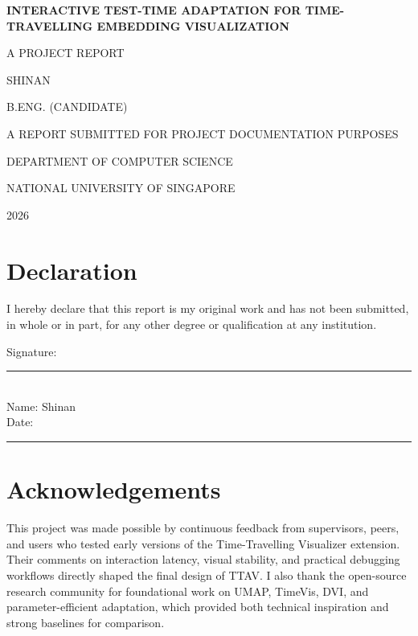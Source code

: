 \documentclass[12pt,a4paper]{report}
\newcommand{\systemname}{TTAV}
\newcommand{\projectname}{Time-Travelling Visualizer}
\begin{document}

\begin{titlepage}
\centering
{\fontsize{16}{20}\selectfont\bfseries INTERACTIVE TEST-TIME ADAPTATION FOR TIME-TRAVELLING EMBEDDING VISUALIZATION\par}
\vspace{2.5cm}
{\Large A PROJECT REPORT\par}
\vspace{2.0cm}
{\large SHINAN\par}
\vspace{1.0cm}
{\large B.ENG. (CANDIDATE)\par}
\vfill
{\large A REPORT SUBMITTED FOR PROJECT DOCUMENTATION PURPOSES\par}
\vspace{0.7cm}
{\large DEPARTMENT OF COMPUTER SCIENCE\par}
{\large NATIONAL UNIVERSITY OF SINGAPORE\par}
\vspace{0.7cm}
{\large 2026\par}
\end{titlepage}

\cleardoublepage
{}
\setcounter{page}{1}

\chapter*{Declaration}
I hereby declare that this report is my original work and has not been submitted, in whole or in part, for any other degree or qualification at any institution.

\vspace{1.5cm}
\noindent
Signature: \rule{5cm}{0.4pt}\\
Name: Shinan\\
Date: \rule{3cm}{0.4pt}

\chapter*{Acknowledgements}
This project was made possible by continuous feedback from supervisors, peers, and users who tested early versions of the \projectname{} extension. Their comments on interaction latency, visual stability, and practical debugging workflows directly shaped the final design of \systemname{}. I also thank the open-source research community for foundational work on UMAP, TimeVis, DVI, and parameter-efficient adaptation, which provided both technical inspiration and strong baselines for comparison.
\end{document}
